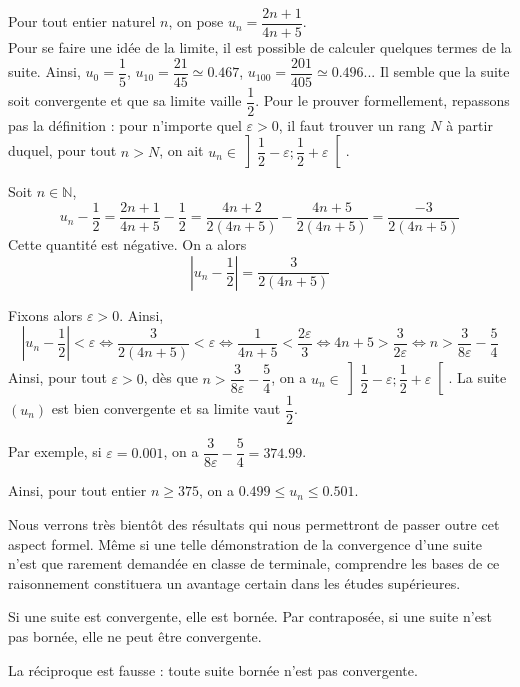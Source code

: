 \documentclass[11pt,fleqn]{book} %
\begin{document}
\begin{example} Pour tout entier naturel $n$, on pose $u_n=\dfrac{2n+1}{4n+5}$. \\
Pour se faire une idée de la limite, il est possible de calculer quelques termes de la suite. Ainsi, $u_0=\dfrac{1}{5}$, $u_{10}=\dfrac{21}{45}\simeq 0.467$, $u_{100} = \dfrac{201}{405} \simeq 0.496$... Il semble que la suite soit convergente et que sa limite vaille $\dfrac{1}{2}$.
\vskip15pt
Pour le prouver formellement, repassons pas la définition  : pour n'importe quel $\varepsilon >0$, il faut trouver un rang $N$ à partir duquel, pour tout $n>N$, on ait $u_n \in \left] \dfrac{1}{2}-\varepsilon ; \dfrac{1}{2}+\varepsilon \right[$.

Soit $n\in\mathbb{N}$, 
\[u_n-\dfrac{1}{2}=\dfrac{2n+1}{4n+5}-\dfrac{1}{2}=\dfrac{4n+2}{2(4n+5)}-\dfrac{4n+5}{2(4n+5)}=\dfrac{-3}{2(4n+5)}\]
Cette quantité est négative. On a alors \[\left\lvert u_n - \dfrac{1}{2} \right\rvert = \dfrac{3}{2(4n+5)}\]

Fixons alors $\varepsilon >0$. Ainsi, 
\[ \left\lvert u_n - \dfrac{1}{2} \right\rvert < \varepsilon \Leftrightarrow \dfrac{3}{2(4n+5)} < \varepsilon \Leftrightarrow \dfrac{1}{4n+5}<\dfrac{2\varepsilon}{3} \Leftrightarrow 4n+5 > \dfrac{3}{2\varepsilon} \Leftrightarrow n > \dfrac{3}{8\varepsilon}-\dfrac{5}{4} \]
Ainsi, pour tout $\varepsilon >0$, dès que $n  > \dfrac{3}{8\varepsilon}-\dfrac{5}{4}$, on a $u_n \in \left] \dfrac{1}{2}-\varepsilon ; \dfrac{1}{2}+\varepsilon \right[$. La suite $(u_n)$ est bien convergente et sa limite vaut $\dfrac{1}{2}$.

Par exemple, si $\varepsilon = 0.001$, on a $\dfrac{3}{8\varepsilon}-\dfrac{5}{4}= 374.99$. 

Ainsi, pour tout entier $n\geqslant 375$, on a  $0.499 \leqslant u_n \leqslant 0.501$.\end{example}

Nous verrons très bientôt des résultats qui nous permettront de passer outre cet aspect formel. Même si une telle démonstration de la convergence d'une suite n'est que rarement demandée en classe de terminale, comprendre les bases de ce raisonnement constituera un avantage certain dans les études supérieures.

\begin{proposition}Si une suite est convergente, elle est bornée. Par contraposée, si une suite n'est pas bornée, elle ne peut être convergente.\end{proposition}

 La réciproque est fausse : toute suite bornée n'est pas convergente. 
 
\end{document}
